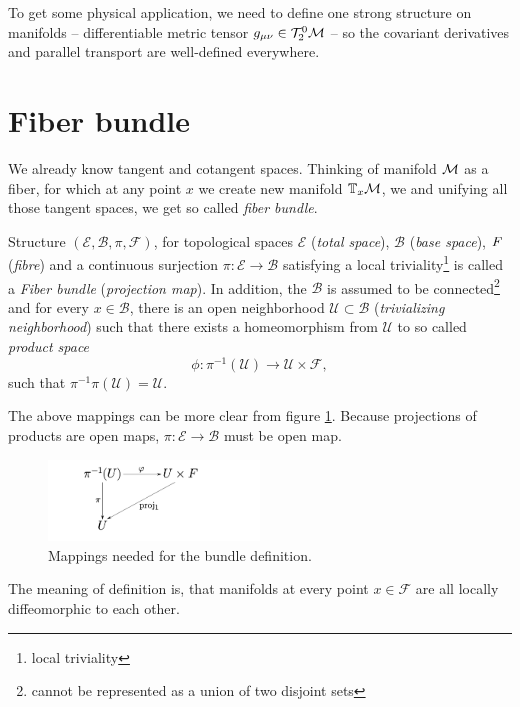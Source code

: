 To get some physical application, we need to define one strong structure on manifolds -- differentiable metric tensor $g_{\mu\nu}\in\mathcal{T}^0_2\mathcal{M}$ -- so the covariant derivatives and parallel transport are well-defined everywhere. 


\section{Fiber bundle}
\label{sec:bundleDef}
We already know tangent and cotangent spaces. Thinking of manifold $\mathcal{M}$ as a fiber, for which at any point $x$ we create new manifold $\mathbb{T}_x\mathcal{M}$, we and unifying all those tangent spaces, we get so called \emph{fiber bundle}. 
\begin{definition}
    Structure $(\mathcal{E},\mathcal{B},\pi,\mathcal{F})$, for topological spaces $\mathcal{E}$ (\emph{total space}), $\mathcal{B}$ (\emph{base space}), $\emph{F}$ (\emph{fibre}) and a continuous surjection $\pi: \mathcal{E}\rightarrow \mathcal{B}$ satisfying a local triviality\footnote{local triviality} is called a \emph{Fiber bundle} (\emph{projection map}). In addition, the $\mathcal{B}$ is assumed to be connected\footnote{cannot be represented as a union of two disjoint sets} and for every $x\in \mathcal{B}$, there is an open neighborhood $\mathcal{U}\subset \mathcal{B}$ (\emph{trivializing neighborhood}) such that there exists a homeomorphism from $\mathcal{U}$ to so called \emph{product space}
    $$\phi: \pi^{-1}(\mathcal{U})\rightarrow \mathcal{U}\times \mathcal{F},$$
    such that $\pi^{-1}\pi(\mathcal{U})=\mathcal{U}$.
\end{definition}

The above mappings can be more clear from figure \ref{fig:bundle}. Because projections of products are open maps, $\pi: \mathcal{E}\rightarrow \mathcal{B}$ must be open map.
\begin{figure}[h]
    \centering
    \includegraphics[width=0.5\textwidth]{../img/bundle.png}
    \caption{Mappings needed for the bundle definition.}
    \label{fig:bundle}    
\end{figure}
The meaning of definition is, that manifolds at every point $x\in \mathcal{F}$ are all locally diffeomorphic to each other.


